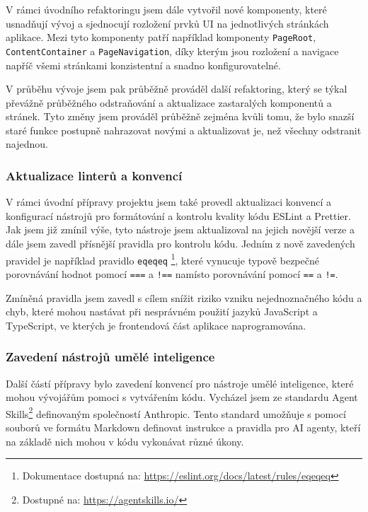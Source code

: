 V rámci úvodního refaktoringu jsem dále vytvořil nové komponenty, které usnadňují vývoj a sjednocují rozložení prvků UI na jednotlivých stránkách aplikace. Mezi tyto komponenty patří například komponenty \texttt{PageRoot}, \texttt{ContentContainer} a \texttt{PageNavigation}, díky kterým jsou rozložení a navigace napříč všemi stránkami konzistentní a snadno konfigurovatelné.

V průběhu vývoje jsem pak průběžně prováděl další refaktoring, který se týkal převážně průběžného odstraňování a aktualizace zastaralých komponentů a stránek. Tyto změny jsem prováděl průběžně zejména kvůli tomu, že bylo snazší staré funkce postupně nahrazovat novými a aktualizovat je, než všechny odstranit najednou.

\subsubsection{Aktualizace linterů a konvencí}

V rámci úvodní přípravy projektu jsem také provedl aktualizaci konvencí a konfigurací nástrojů pro formátování a kontrolu kvality kódu ESLint a Prettier. Jak jsem již zmínil výše, tyto nástroje jsem aktualizoval na jejich novější verze a dále jsem zavedl přísnější pravidla pro kontrolu kódu. Jedním z nově zavedených pravidel je například pravidlo \texttt{eqeqeq} \footnote{Dokumentace dostupná na: \href{https://eslint.org/docs/latest/rules/eqeqeq}{https://eslint.org/docs/latest/rules/eqeqeq}}, které vynucuje typově bezpečné porovnávání hodnot pomocí \texttt{===} a \texttt{!==} namísto porovnávání pomocí \texttt{==} a \texttt{!=}.

Zmíněná pravidla jsem zavedl s cílem snížit riziko vzniku nejednoznačného kódu a chyb, které mohou nastávat při nesprávném použití jazyků JavaScript a TypeScript, ve kterých je frontendová část aplikace naprogramována.

\subsubsection{Zavedení nástrojů umělé inteligence}

Další částí přípravy bylo zavedení konvencí pro nástroje umělé inteligence, které mohou vývojářům pomoci s vytvářením kódu. Vycházel jsem ze standardu Agent Skills\footnote{Dostupné na: \href{https://agentskills.io/}{https://agentskills.io/}} definovaným společností Anthropic. Tento standard umožňuje s pomocí souborů ve formátu Markdown definovat instrukce a pravidla pro AI agenty, kteří na základě nich mohou v kódu vykonávat různé úkony.

